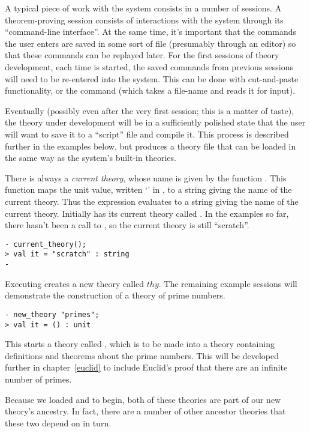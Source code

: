 A typical piece of work with the \HOL{} system consists in a number of
sessions.  A theorem-proving session consists of interactions with the
system through its ``command-line interface''.  At the same time, it's
important that the commands the user enters are saved in some sort of
file (presumably through an editor) so that these commands can be
replayed later.  For the first sessions of theory development, each
time \HOL{} is started, the saved commands from previous sessions will
need to be re-entered into the system.  This can be done with
cut-and-paste functionality, or the  command (which takes a
file-name and reads it for input).

Eventually (possibly even after the very first session; this is a
matter of taste), the theory under development will be in a
sufficiently polished state that the user will want to save it to a
``script'' file and compile it.  This process is described further in
the examples below, but produces a theory file that can be loaded in
the same way as the system's built-in theories.

There is always a {\it current theory\/}, whose name is given by the
function .  This function maps the unit value,
written `\ml{()}' in \ML, to a string giving the name of the current
theory.  Thus the \ML{} expression  evaluates to
a string giving the name of the current theory.  Initially \HOL{} has
its current theory called .  In the examples so far, there
hasn't been a call to , so the current theory is still
``scratch''.

\begin{session}\begin{verbatim}
- current_theory();
> val it = "scratch" : string
-
\end{verbatim}\end{session}

    Executing  creates a new theory called
    $thy$.  The remaining example sessions will demonstrate the
    construction of a theory of prime numbers.

\begin{session}\begin{verbatim}
- new_theory "primes";
> val it = () : unit
\end{verbatim}\end{session}

\noindent
This starts a theory called , which is to be made into a
theory containing definitions and theorems about the prime numbers.
This will be developed further in chapter~\ref{euclid} to include
Euclid's proof that there are an infinite number of primes.

Because we loaded  and  to begin,
both of these theories are part of our new theory's ancestry.  In
fact, there are a number of other ancestor theories that these two
depend on in turn.

